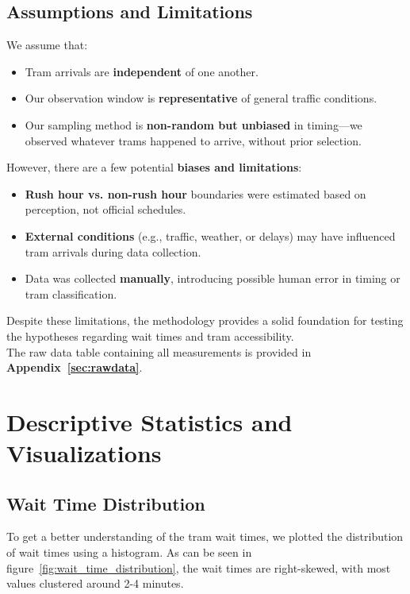 \documentclass[a4paper, 10pt]{article}
\begin{document}
			\subsection*{Assumptions and Limitations}
				We assume that:
				\begin{itemize}
						\item Tram arrivals are \textbf{independent} of one another.
						\item Our observation window is \textbf{representative} of general traffic conditions.
						\item Our sampling method is \textbf{non-random but unbiased} in timing—we observed whatever trams happened to arrive, without prior selection.
				\end{itemize}

				\noindent However, there are a few potential \textbf{biases and limitations}:
				\begin{itemize}
						\item \textbf{Rush hour vs. non-rush hour} boundaries were estimated based on perception, not official schedules.
						\item \textbf{External conditions} (e.g., traffic, weather, or delays) may have influenced tram arrivals during data collection.
						\item Data was collected \textbf{manually}, introducing possible human error in timing or tram classification.
				\end{itemize}

				\noindent Despite these limitations, the methodology provides a solid foundation for testing the hypotheses regarding wait times and tram accessibility. \\

				\noindent The raw data table containing all measurements is provided in \textbf{Appendix~\ref{sec:rawdata}}.

	\section{Descriptive Statistics and Visualizations}
		\subsection{Wait Time Distribution}
				To get a better understanding of the tram wait times,
				we plotted the distribution of wait times using a histogram. As can be seen in figure~\ref{fig:wait_time_distribution},
				the wait times are right-skewed, with most values clustered around 2-4 minutes.
\end{document}
